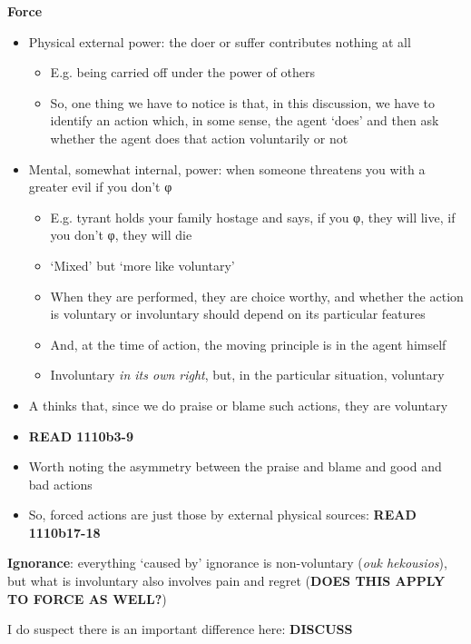 \documentclass[11pt]{article}
\newcommand{\gk}[1]{\textgreek{#1}}
\begin{document}
\noindent\textbf{Force}

\begin{itemize}\item{Physical external power: the doer or suffer contributes nothing at all}\begin{itemize}\item{E.g. being carried off under the power of others}\item{So, one thing we have to notice is that, in this discussion, we have to identify an action which, in some sense, the agent `does' and then ask whether the agent does that action voluntarily or not}\end{itemize}\item{Mental, somewhat internal, power: when someone threatens you with a greater evil if you don't \gk{φ}}\begin{itemize}\item{E.g. tyrant holds your family hostage and says, if you \gk{φ}, they will live, if you don't \gk{φ}, they will die}\item{`Mixed' but `more like voluntary'}\item{When they are performed, they are choice worthy, and whether the action is voluntary or involuntary should depend on its particular features}\item{And, at the time of action, the moving principle is in the agent himself}\item{Involuntary \emph{in its own right}, but, in the particular situation, voluntary}\end{itemize}\item{A thinks that, since we do praise or blame such actions, they are voluntary}\item{\textbf{READ 1110b3-9}}\item{Worth noting the asymmetry between the praise and blame and good and bad actions}\item{So, forced actions are just those by external physical sources: \textbf{READ 1110b17-18}}\end{itemize}


\noindent\textbf{Ignorance}: everything `caused by' ignorance is non-voluntary (\emph{ouk hekousios}), but what is involuntary also involves pain and regret (\textbf{DOES THIS APPLY TO FORCE AS WELL?})
\vspace*{2mm}

\noindent I do suspect there is an important difference here: \textbf{DISCUSS}
\vspace*{2mm}
\end{document}
